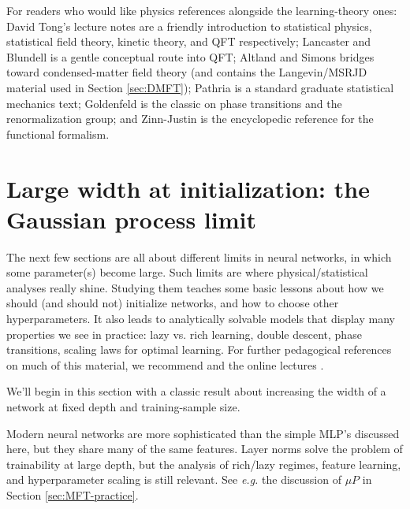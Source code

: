 \documentclass[11pt]{article}
\begin{document}
For readers who would like physics references alongside the learning-theory ones: David Tong's lecture notes \cite{TongStatPhysics,TongSFT,TongKineticTheory,TongQFT} are a friendly introduction to statistical physics, statistical field theory, kinetic theory, and QFT respectively; Lancaster and Blundell \cite{lancaster2014quantumGifted} is a gentle conceptual route into QFT; Altland and Simons \cite{altlandCondensedMatterField2010} bridges toward condensed-matter field theory (and contains the Langevin/MSRJD material used in Section \ref{sec:DMFT}); Pathria \cite{pathriaStatisticalMechanics2011} is a standard graduate statistical mechanics text; Goldenfeld \cite{goldenfeldLecturesPhaseTransitions2018a} is the classic on phase transitions and the renormalization group; and Zinn-Justin \cite{zinn2002quantum} is the encyclopedic reference for the functional formalism.





\section{Large width at initialization: the Gaussian process limit}
\label{sec:init}

The next few sections are all about different limits in neural networks, in which some parameter(s) become large. Such limits are where physical/statistical analyses really shine. Studying them teaches some basic lessons about how we should (and should not) initialize networks, and how to choose other hyperparameters. It also leads to analytically solvable models that display many properties we see in practice: lazy vs. rich learning, double descent, phase transitions, scaling laws for optimal learning. For further pedagogical references on much of this material, we recommend \cite{roberts2022principles,spiliopoulos2025foundations,ringel2025applications} and the online lectures \cite{hanin2026mdl}.

We'll begin in this section with a classic result \cite{neal1996bayesian, lee2018deep, yang2019tensorprograms1, hanin2023random} about increasing the width of a network at fixed depth and training-sample size.

\smallskip
Modern neural networks are more sophisticated than the simple MLP's discussed here, but they share many of the same features. Layer norms solve the problem of trainability at large depth, but the analysis of rich/lazy regimes, feature learning, and hyperparameter scaling is still relevant. See \emph{e.g.} the discussion of $\mu P$ in Section \ref{sec:MFT-practice}.
\end{document}
